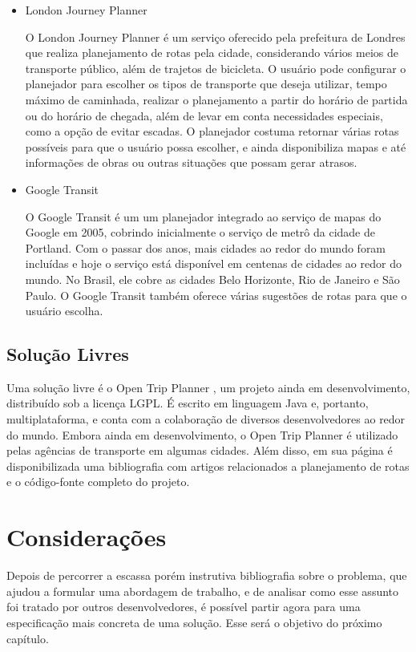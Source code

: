 \begin{itemize}

\item London Journey Planner \cite{tfl}

O London Journey Planner é um serviço oferecido pela prefeitura de Londres que realiza planejamento de rotas pela cidade, considerando vários meios de transporte público, além de trajetos de bicicleta. O usuário pode configurar o planejador para escolher os tipos de transporte que deseja utilizar, tempo máximo de caminhada, realizar o planejamento a partir do horário de partida ou do horário de chegada, além de levar em conta necessidades especiais, como a opção de evitar escadas. O planejador costuma retornar várias rotas possíveis para que o usuário possa escolher, e ainda disponibiliza mapas e até informações de obras ou outras situações que possam gerar atrasos.

\item Google Transit \cite{googletransit}

O Google Transit é um um planejador integrado ao serviço de mapas do Google em 2005, cobrindo inicialmente o serviço de metrô da cidade de Portland. Com o passar dos anos, mais cidades ao redor do mundo foram incluídas e hoje o serviço está disponível em centenas de cidades ao redor do mundo. No Brasil, ele cobre as cidades Belo Horizonte, Rio de Janeiro e São Paulo. O Google Transit também oferece várias sugestões de rotas para que o usuário escolha.

\end{itemize}

\subsection{Solução Livres}

Uma solução livre é o Open Trip Planner \cite{otp}, um projeto ainda em desenvolvimento, distribuído sob a licença LGPL. É escrito em linguagem Java e, portanto, multiplataforma, e conta com a colaboração de diversos desenvolvedores ao redor do mundo. Embora ainda em desenvolvimento, o Open Trip Planner é utilizado pelas agências de transporte em algumas cidades. Além disso, em sua página é disponibilizada uma bibliografia com artigos relacionados a planejamento de rotas e o código-fonte completo do projeto.

\section{Considerações}

Depois de percorrer a escassa porém instrutiva bibliografia sobre o problema, que ajudou a formular uma abordagem de trabalho, e de analisar como esse assunto foi tratado por outros desenvolvedores, é possível partir agora para uma especificação mais concreta de uma solução. Esse será o objetivo do próximo capítulo.
